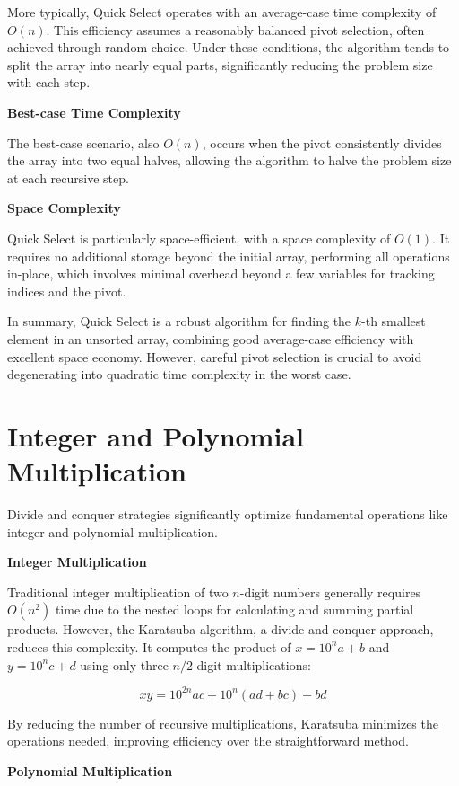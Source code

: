 \documentclass[12pt]{book} %
\begin{document}
More typically, Quick Select operates with an average-case time complexity of \(O(n)\). This efficiency assumes a reasonably balanced pivot selection, often achieved through random choice. Under these conditions, the algorithm tends to split the array into nearly equal parts, significantly reducing the problem size with each step.

\textbf{Best-case Time Complexity}

The best-case scenario, also \(O(n)\), occurs when the pivot consistently divides the array into two equal halves, allowing the algorithm to halve the problem size at each recursive step.

\textbf{Space Complexity}

Quick Select is particularly space-efficient, with a space complexity of \(O(1)\). It requires no additional storage beyond the initial array, performing all operations in-place, which involves minimal overhead beyond a few variables for tracking indices and the pivot.

In summary, Quick Select is a robust algorithm for finding the \(k\)-th smallest element in an unsorted array, combining good average-case efficiency with excellent space economy. However, careful pivot selection is crucial to avoid degenerating into quadratic time complexity in the worst case.


\section{Integer and Polynomial Multiplication}
Divide and conquer strategies significantly optimize fundamental operations like integer and polynomial multiplication.

\textbf{Integer Multiplication}

Traditional integer multiplication of two \(n\)-digit numbers generally requires \(O(n^2)\) time due to the nested loops for calculating and summing partial products. However, the Karatsuba algorithm, a divide and conquer approach, reduces this complexity. It computes the product of \(x = 10^n a + b\) and \(y = 10^n c + d\) using only three \(n/2\)-digit multiplications:

\[
xy = 10^{2n} ac + 10^n(ad + bc) + bd
\]

By reducing the number of recursive multiplications, Karatsuba minimizes the operations needed, improving efficiency over the straightforward method.

\textbf{Polynomial Multiplication}
\end{document}

